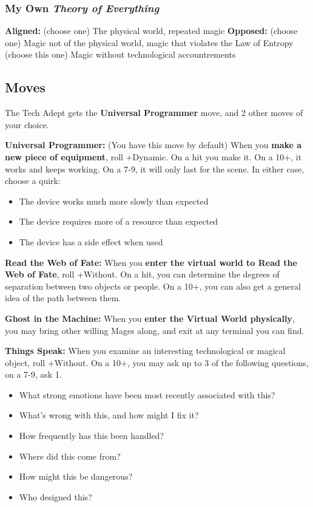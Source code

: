 \documentclass[
]{memoir}
\begin{document}
\hypertarget{my-own-theory-of-everything}{%
\subsubsection{\texorpdfstring{My Own \emph{Theory of
Everything}}{My Own Theory of Everything}}\label{my-own-theory-of-everything}}

\textbf{Aligned:} (choose one) The physical world, repeated magic
\textbf{Opposed:} (choose one) Magic not of the physical world, magic
that violates the Law of Entropy\\
(choose this one) Magic without technological accountrements

\hypertarget{moves-6}{%
\subsection{Moves}\label{moves-6}}

The Tech Adept gets the \textbf{Universal Programmer} move, and 2 other
moves of your choice.

\textbf{Universal Programmer:} (You have this move by default) When you
\textbf{make a new piece of equipment}, roll +Dynamic. On a hit you make
it. On a 10+, it works and keeps working. On a 7-9, it will only last
for the scene. In either case, choose a quirk:

\begin{itemize}
\tightlist
\item
  The device works much more slowly than expected
\item
  The device requires more of a resource than expected
\item
  The device has a side effect when used
\end{itemize}

\textbf{Read the Web of Fate:} When you \textbf{enter the virtual world
to Read the Web of Fate}, roll +Without. On a hit, you can determine the
degrees of separation between two objects or people. On a 10+, you can
also get a general idea of the path between them.

\textbf{Ghost in the Machine:} When you \textbf{enter the Virtual World
physically}, you may bring other willing Mages along, and exit at any
terminal you can find.

\textbf{Things Speak:} When you examine an interesting technological or
magical object, roll +Without. On a 10+, you may ask up to 3 of the
following questions, on a 7-9, ask 1.

\begin{itemize}
\tightlist
\item
  What strong emotions have been most recently associated with this?
\item
  What's wrong with this, and how might I fix it?
\item
  How frequently has this been handled?
\item
  Where did this come from?
\item
  How might this be dangerous?
\item
  Who designed this?
\end{itemize}
\end{document}
